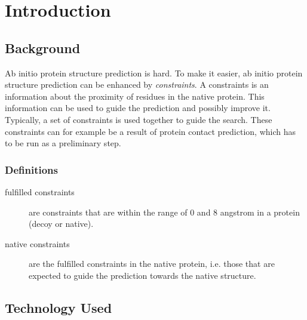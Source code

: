 \documentclass[a4paper, 11pt, parskip=half]{scrartcl}
\title{\titleString}
\author{David Lassner}
\author{Moritz Neeb}
\affil{\groupName}
\begin{document}
\maketitle



\section{Introduction}

\subsection{Background}

Ab initio protein structure prediction is hard.
To make it easier, ab initio protein structure prediction
can be enhanced by \emph{constraints}.
A constraints is an information about the proximity of residues in the native protein.
This information can be used to guide the prediction and possibly improve it.
Typically, a set of constraints is used together to guide the search.
These constraints can for example be a result of protein contact prediction,
which has to be run as a preliminary step.

\subsubsection*{Definitions}
\begin{description}
	\item[fulfilled constraints] are constraints that are within the range of $0$ and $8$ angstrom in a protein (decoy or native).
	\item[native constraints] are the fulfilled constraints in the native protein,
	i.e. those that are expected to guide the prediction towards the native structure.
\end{description}

\subsection{Technology Used}
\end{document}
